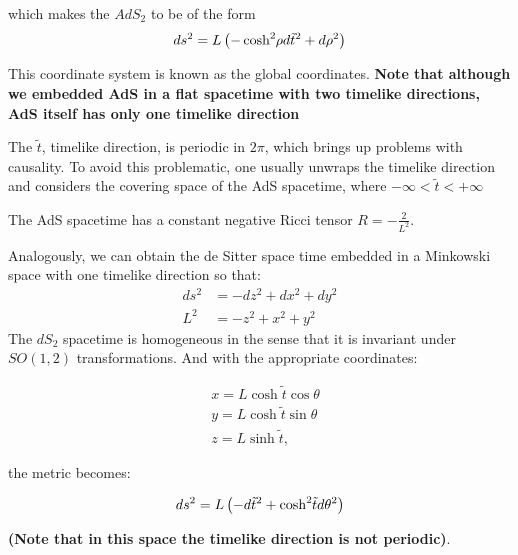 \documentclass[12pt]{article}
\begin{document}
which makes the \( AdS_2 \) to be of the form
\begin{equation}
    ds^2 = L \left( -\cosh^2{ \hspace{-2pt}\rho } d\tilde{t}^2 + d\rho^2 \right)
\end{equation}

This coordinate system is known as the global coordinates. \textbf{Note that although we embedded AdS in a flat spacetime with two timelike directions, AdS itself has only one timelike direction}

\vspace{0.5cm}

The \( \tilde{t} \), timelike direction, is periodic in \( 2\pi \), which brings up problems with causality. To avoid this problematic, one usually unwraps the timelike direction and considers the covering space of the AdS spacetime, where \( -\infty < \tilde{t} < +\infty \) 
\vspace{0.5cm}

The AdS spacetime has a constant negative Ricci tensor \( R = -\frac{2}{L^2} \).

Analogously, we can obtain the de Sitter space time embedded in a Minkowski space with one timelike direction so that:
\begin{equation}
\begin{aligned}
    ds^2 &= -dz^2 + dx^2 + dy^2 \\
    L^2 &= -z^2 + x^2 + y^2
\end{aligned}
\end{equation}
The \( dS_2 \) spacetime is homogeneous in the sense that it is invariant under \( SO(1,2) \) transformations. And with the appropriate coordinates:

\begin{equation}
\begin{aligned}
    & x = L \cosh{ \tilde{t} } \cos{ \theta } \\
    & y = L \cosh{ \tilde{t} } \sin{ \theta } \\
    & z = L \sinh{ \tilde{t} },
\end{aligned}
\end{equation}

the metric becomes:

\begin{equation}
    ds^2 = L \left( - d\tilde{t}^2 + \cosh^2{ \hspace{-2pt}\tilde{t} }d\theta^2 \right)
\end{equation}

\textbf{(Note that in this space the timelike direction is not periodic)}.
\end{document}
